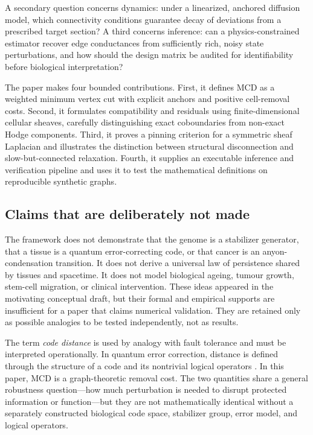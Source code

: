 \documentclass[12pt,a4paper]{article}
\begin{document}
A secondary question concerns dynamics: under a linearized, anchored diffusion model, which connectivity conditions guarantee decay of deviations from a prescribed target section? A third concerns inference: can a physics-constrained estimator recover edge conductances from sufficiently rich, noisy state perturbations, and how should the design matrix be audited for identifiability before biological interpretation?

The paper makes four bounded contributions. First, it defines MCD as a weighted minimum vertex cut with explicit anchors and positive cell-removal costs. Second, it formulates compatibility and residuals using finite-dimensional cellular sheaves, carefully distinguishing exact coboundaries from non-exact Hodge components. Third, it proves a pinning criterion for a symmetric sheaf Laplacian and illustrates the distinction between structural disconnection and slow-but-connected relaxation. Fourth, it supplies an executable inference and verification pipeline and uses it to test the mathematical definitions on reproducible synthetic graphs.

\subsection{Claims that are deliberately not made}
The framework does not demonstrate that the genome is a stabilizer generator, that a tissue is a quantum error-correcting code, or that cancer is an anyon-condensation transition. It does not derive a universal law of persistence shared by tissues and spacetime. It does not model biological ageing, tumour growth, stem-cell migration, or clinical intervention. These ideas appeared in the motivating conceptual draft, but their formal and empirical supports are insufficient for a paper that claims numerical validation. They are retained only as possible analogies to be tested independently, not as results.

The term \emph{code distance} is used by analogy with fault tolerance and must be interpreted operationally. In quantum error correction, distance is defined through the structure of a code and its nontrivial logical operators \citep{Kitaev2003}. In this paper, MCD is a graph-theoretic removal cost. The two quantities share a general robustness question---how much perturbation is needed to disrupt protected information or function---but they are not mathematically identical without a separately constructed biological code space, stabilizer group, error model, and logical operators.
\end{document}
